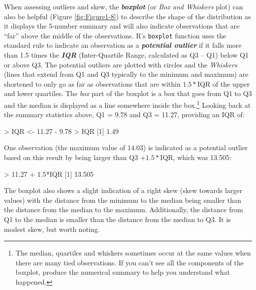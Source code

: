 \documentclass[
]{book}
\newenvironment{Shaded}{\begin{snugshade}}{\end{snugshade}}
\newcommand{\DecValTok}[1]{\textcolor[rgb]{0.00,0.00,0.81}{#1}}
\newcommand{\FloatTok}[1]{\textcolor[rgb]{0.00,0.00,0.81}{#1}}
\newcommand{\NormalTok}[1]{#1}
\newcommand{\OtherTok}[1]{\textcolor[rgb]{0.56,0.35,0.01}{#1}}
\newcommand{\SpecialCharTok}[1]{\textcolor[rgb]{0.00,0.00,0.00}{#1}}
\begin{document}
\indent When assessing outliers and skew, the \textbf{\emph{boxplot}}
(or \emph{Box and Whiskers} plot) can also be helpful (Figure \ref{fig:Figure1-8}) to describe the
shape of the distribution as it displays the 5-number summary and will also indicate
observations that are ``far'' above the middle of the observations.
R's \texttt{boxplot} function uses the standard rule to indicate an observation as a
\textbf{\emph{potential outlier}} if it falls more than 1.5 times the \textbf{\emph{IQR}}
(Inter-Quartile Range, calculated as Q3 -- Q1) below Q1 or above Q3.
The potential outliers
are plotted with circles and the \emph{Whiskers} (lines that extend from Q1 and Q3 typically to
the minimum and maximum) are shortened to only go as far as
observations that are within \(1.5*\)IQR of the upper and lower quartiles. The \emph{box}
part of the boxplot is a box that goes from Q1 to Q3 and the median is displayed as a line
somewhere inside the box.\footnote{The median, quartiles and whiskers sometimes occur at the same
  values when there are many tied observations. If you can't see all the
  components of the boxplot, produce the numerical summary to help you understand
  what happened.} Looking back at the summary statistics above, Q1 = 9.78 and Q3 = 11.27, providing an IQR of:

\begin{Shaded}
\begin{Highlighting}[]
\SpecialCharTok{\textgreater{}}\NormalTok{ IQR }\OtherTok{\textless{}{-}} \FloatTok{11.27} \SpecialCharTok{{-}} \FloatTok{9.78}
\SpecialCharTok{\textgreater{}}\NormalTok{ IQR}
\NormalTok{[}\DecValTok{1}\NormalTok{] }\FloatTok{1.49}
\end{Highlighting}
\end{Shaded}

One observation (the maximum value of 14.03) is indicated as a potential outlier
based on this result by being larger than Q3 \(+1.5*\)IQR, which was 13.505:

\begin{Shaded}
\begin{Highlighting}[]
\SpecialCharTok{\textgreater{}} \FloatTok{11.27} \SpecialCharTok{+} \FloatTok{1.5}\SpecialCharTok{*}\NormalTok{IQR}
\NormalTok{[}\DecValTok{1}\NormalTok{] }\FloatTok{13.505}
\end{Highlighting}
\end{Shaded}

\indent The boxplot also shows a slight indication of a right skew (skew towards
larger values) with the distance from the minimum to the median being smaller than the
distance from the median to the maximum. Additionally, the distance from Q1 to
the median is smaller than the distance from the median to Q3. It is modest skew,
but worth noting.
\end{document}
